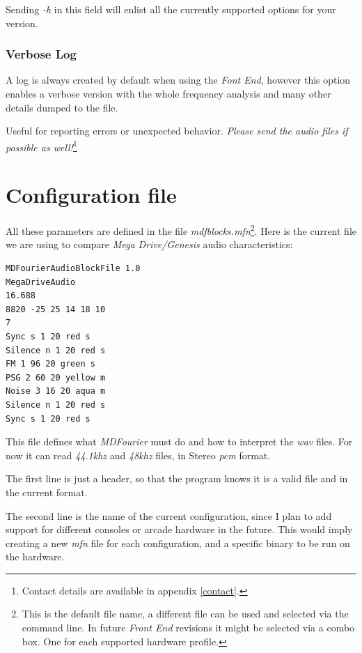 \documentclass[10pt,a4paper]{report}
\newcommand{\ac}[1]{\textit{\acrshort{#1}}}
\newcommand{\khz}[1]{\textit{#1\acrshort{khz}}}
\begin{document}
\begin{appendices}
Sending \textit{-h} in this field will enlist all the currently supported options for your version.

\subsection{Verbose Log}
\label{verbose}

A log is always created by default when using the \textit{Font End}, however this option enables a verbose version with the whole frequency analysis and many other details dumped to the file. 

Useful for reporting errors or unexpected behavior. \textit{Please send the audio files if possible as well!}\footnote{Contact details are available in appendix \ref{contact}.}
	
\chapter{Configuration file}
\label{mfnconfig}

All these parameters are defined in the file \textit{mdfblocks.mfn}\footnote{This is the default file name, a different file can be used and selected via the command line. In future \textit{Front End} revisions it might be selected via a combo box. One for each supported hardware profile.}. Here is the current file we are using to compare \textit{Mega Drive/Genesis} audio characteristics:

\begin{verbatim}
MDFourierAudioBlockFile 1.0
MegaDriveAudio
16.688
8820 -25 25 14 18 10
7
Sync s 1 20 red s
Silence n 1 20 red s
FM 1 96 20 green s
PSG 2 60 20 yellow m
Noise 3 16 20 aqua m
Silence n 1 20 red s
Sync s 1 20 red s
\end{verbatim}

This file defines what \textit{MDFourier} must do and how to interpret the \ac{wav} files. For now it can read \khz{44.1} and \khz{48} files, in Stereo \ac{pcm} format.

The first line is just a header, so that the program knows it is a valid file and in the current format.

The second line is the name of the current configuration, since I plan to add support for different consoles or arcade hardware in the future. This would imply creating a new \textit{mfn} file for each configuration, and a specific binary to be run on the hardware.


\end{appendices}
\end{document}
